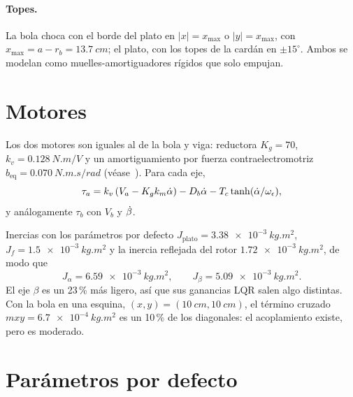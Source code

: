 \paragraph{Topes.} La bola choca con el borde del plato en $|x|=x_{\max}$ o $|y|=x_{\max}$, con $x_{\max}=a-r_b=\SI{13.7}{cm}$; el plato, con los topes de la cardán en $\pm15^\circ$. Ambos se modelan como muelles-amortiguadores rígidos que solo empujan.

\section{Motores}

Los dos motores son iguales al de la bola y viga: reductora $K_g=70$, $k_v=\SI{0.128}{N.m/V}$ y un amortiguamiento por fuerza contraelectromotriz $b_{\text{eq}}=\SI{0.070}{N.m.s/rad}$ (véase~\cite{viga}). Para cada eje,
\begin{equation}
  \tau_a = k_v\left(V_a - K_gk_m\dot{\alpha}\right) - D_b\dot{\alpha} - T_c\tanh(\dot{\alpha}/\omega_\epsilon),
  \label{eq:motor}
\end{equation}
y análogamente $\tau_b$ con $V_b$ y $\dot{\beta}$.

\begin{ejemplo}{Inercias con los parámetros por defecto}
$J_{\text{plato}}=\SI{3.38e-3}{kg.m^2}$, $J_f=\SI{1.5e-3}{kg.m^2}$ y la inercia reflejada del rotor $\SI{1.72e-3}{kg.m^2}$, de modo que
\[
J_\alpha=\SI{6.59e-3}{kg.m^2},\qquad J_\beta=\SI{5.09e-3}{kg.m^2}.
\]
El eje $\beta$ es un 23\,\% más ligero, así que sus ganancias LQR salen algo distintas. Con la bola en una esquina, $(x,y)=(\SI{10}{cm},\SI{10}{cm})$, el término cruzado $mxy=\SI{6.7e-4}{kg.m^2}$ es un 10\,\% de los diagonales: el acoplamiento existe, pero es moderado.
\end{ejemplo}

\section{Parámetros por defecto}

